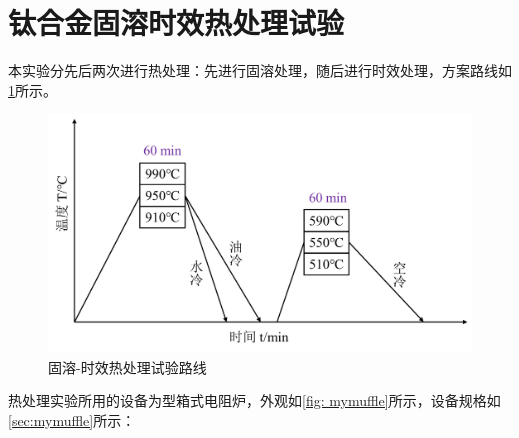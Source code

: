 \section{钛合金固溶时效热处理试验}
本实验分先后两次进行热处理：先进行固溶处理，随后进行时效处理，方案路线如\ref{fig: heatway}所示。
\begin{figure}[h!]
	\centering
	\includegraphics[width=0.7\linewidth]{pic/处理路线}
	\caption{固溶-时效热处理试验路线}
	\label{fig: heatway}
\end{figure}

热处理实验所用的设备为型箱式电阻炉，外观如\ref{fig: mymuffle}所示，设备规格如\ref{sec:mymuffle}所示：


